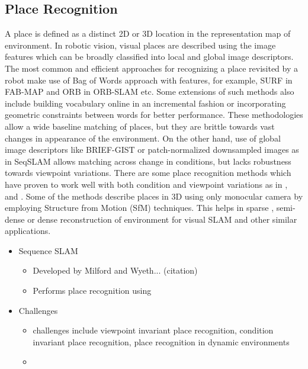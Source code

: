 \subsection{Place Recognition}
A place is defined as a distinct 2D or 3D location in the representation map of environment. In robotic vision, visual places are described using the image features which can be broadly classified into local and global image descriptors. The most common and efficient approaches for recognizing a place revisited by a robot make use of Bag of Words approach with features, for example, SURF in FAB-MAP \cite{Cummins2010} and ORB in ORB-SLAM \cite{Montiel2015} etc. Some extensions of such methods also include building vocabulary online in an incremental fashion or incorporating geometric constraints between words for better performance. These methodologies allow a wide baseline matching of places, but they are brittle towards vast changes in appearance of the environment. On the other hand, use of global image descriptors like BRIEF-GIST \cite{Sunderhauf2011} or patch-normalized downsampled images as in SeqSLAM \cite{Milford2012} allows matching across change in conditions, but lacks robustness towards viewpoint variations. There are some place recognition methods which have proven to work well with both condition and viewpoint variations as in \cite{McManus2014}, \cite{Milford2008} and \cite{Niko2015}. Some of the methods describe places in 3D using only monocular camera by employing Structure from Motion (SfM) techniques. This helps in sparse \cite{Montiel2015}, semi-dense \cite{Engel2014lsd, Mur-Artal2015b} or dense \cite{Newcombe2011} reconstruction of environment for visual SLAM and other similar applications.
 
\begin{itemize}
    \item Sequence SLAM
    \begin{itemize}
        \item Developed by Milford and Wyeth... (citation)
        \item Performs place recognition using 
    \end{itemize}
    \item {Challenges}
        \begin{itemize}
            \item challenges include viewpoint invariant place recognition, condition invariant place recognition, place recognition in dynamic environments
            \item 
        \end{itemize}
\end{itemize}